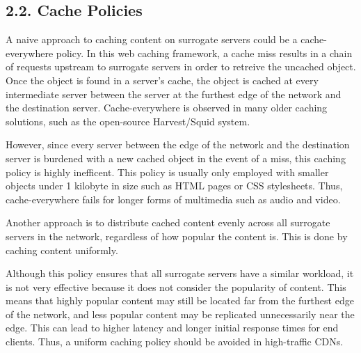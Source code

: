 \documentclass[
	a4paper, %
	10pt, %
	unnumberedsections, %
	twoside, %
]{LTJournalArticle}
\begin{document}
	

\subsection{2.2. Cache Policies}

A naive approach to caching content on surrogate servers could be a cache-everywhere policy. In this web caching framework, a cache miss results in a chain of requests upstream to surrogate servers in order to retreive the uncached object. Once the object is found in a server's cache, the object is cached at every intermediate server between the server at the furthest edge of the network and the destination server. Cache-everywhere is observed in many older caching solutions, such as the open-source Harvest/Squid system. 

However, since every server between the edge of the network and the destination server is burdened with a new cached object in the event of a miss, this caching policy is highly inefficent. This policy is usually only employed with smaller objects under 1 kilobyte in size such as HTML pages or CSS stylesheets. Thus, cache-everywhere fails for longer forms of multimedia such as audio and video. 


Another approach is to distribute cached content evenly across all surrogate servers in the network, regardless of how popular the content is. This is done by caching content uniformly. 

Although this policy ensures that all surrogate servers have a similar workload, it is not very effective because it does not consider the popularity of content. This means that highly popular content may still be located far from the furthest edge of the network, and less popular content may be replicated unnecessarily near the edge. This can lead to higher latency and longer initial response times for end clients. Thus, a uniform caching policy should be avoided in high-traffic CDNs. 
\end{document}
